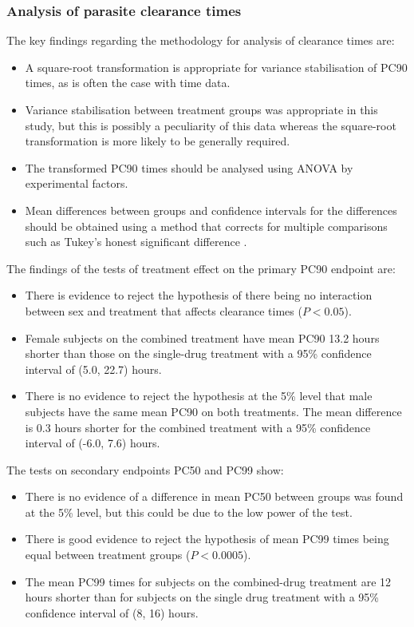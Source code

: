 \subsubsection{Analysis of parasite clearance times}
The key findings regarding the methodology for analysis of clearance times are:
\begin{itemize}
\item A square-root transformation is appropriate for variance stabilisation of PC90 times, as is often the case with time data.
\item Variance stabilisation between treatment groups was appropriate in this study, but this is possibly a peculiarity of this data whereas the square-root transformation is more likely to be generally required.
\item The transformed PC90 times should be analysed using ANOVA by experimental factors.
\item Mean differences between groups and confidence intervals for the differences should be obtained using a method that corrects for multiple comparisons such as Tukey's honest significant difference \cite{montgomery}.
\end{itemize}
The findings of the tests of treatment effect on the primary PC90 endpoint are:
\begin{itemize}
\item There is evidence to reject the hypothesis of there being no interaction between sex and treatment that affects clearance times ($P<0.05$).
\item Female subjects on the combined treatment have mean PC90 13.2 hours shorter than those on the single-drug treatment with a 95\% confidence interval of (5.0, 22.7) hours.
\item There is no evidence to reject the hypothesis at the 5\% level that male subjects have the same mean PC90 on both treatments. The mean difference is 0.3 hours shorter for the combined treatment with a 95\% confidence interval of (-6.0, 7.6) hours.
\end{itemize}
The tests on secondary endpoints PC50 and PC99 show:
\begin{itemize}
\item There is no evidence of a difference in mean PC50 between groups was found at the 5\% level, but this could be due to the low power of the test.
\item There is good evidence to reject the hypothesis of mean PC99 times being equal between treatment groups ($P<0.0005$).
\item The mean PC99 times for subjects on the combined-drug treatment are 12 hours shorter than for subjects on the single drug treatment with a 95\% confidence interval of (8, 16) hours.
\end{itemize}

